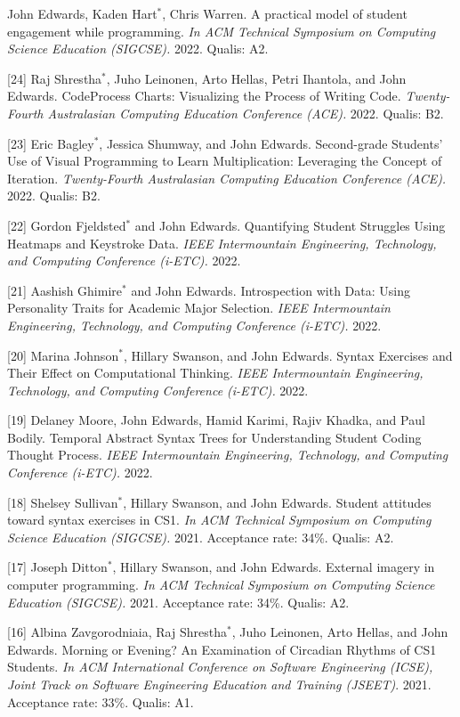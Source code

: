 \documentclass[margin,line]{res}
\newcommand{\cnum}[1]{[#1]}
\begin{document}
\begin{resume}
\cnum{25} John Edwards, Kaden Hart$^*$, Chris Warren. A practical model of student engagement while programming. \textit{In ACM Technical Symposium on Computing Science Education (SIGCSE).} 2022. Qualis: A2.

\cnum{24} Raj Shrestha$^*$, Juho Leinonen, Arto Hellas, Petri Ihantola, and John Edwards. CodeProcess Charts: Visualizing the Process of Writing Code. \textit{Twenty-Fourth Australasian Computing Education Conference (ACE).} 2022. Qualis: B2.

\cnum{23} Eric Bagley$^*$, Jessica Shumway, and John Edwards. Second-grade Students' Use of Visual Programming to Learn Multiplication: Leveraging the Concept of Iteration. \textit{Twenty-Fourth Australasian Computing Education Conference (ACE).} 2022. Qualis: B2.

\cnum{22} Gordon Fjeldsted$^*$ and John Edwards. Quantifying Student Struggles Using Heatmaps and Keystroke Data. \textit{IEEE Intermountain Engineering, Technology, and Computing Conference (i-ETC).} 2022.

\cnum{21} Aashish Ghimire$^*$ and John Edwards. Introspection with Data: Using Personality Traits for Academic Major Selection. \textit{IEEE Intermountain Engineering, Technology, and Computing Conference (i-ETC).} 2022.

\cnum{20} Marina Johnson$^*$, Hillary Swanson, and John Edwards. Syntax Exercises and Their Effect on Computational Thinking. \textit{IEEE Intermountain Engineering, Technology, and Computing Conference (i-ETC).} 2022.

\cnum{19} Delaney Moore, John Edwards, Hamid Karimi, Rajiv Khadka, and Paul Bodily. Temporal Abstract Syntax Trees for Understanding Student Coding Thought Process. \textit{IEEE Intermountain Engineering, Technology, and Computing Conference (i-ETC).} 2022.

\cnum{18} Shelsey Sullivan$^*$, Hillary Swanson, and John Edwards. Student attitudes toward syntax exercises in CS1. \textit{In ACM Technical Symposium on Computing Science Education (SIGCSE).} 2021. Acceptance rate: 34\%. Qualis: A2.

\cnum{17} Joseph Ditton$^*$, Hillary Swanson, and John Edwards. External imagery in computer programming. \textit{In ACM Technical Symposium on Computing Science Education (SIGCSE).} 2021. Acceptance rate: 34\%. Qualis: A2.

\cnum{16} Albina Zavgorodniaia, Raj Shrestha$^*$, Juho Leinonen, Arto Hellas, and John Edwards. Morning or Evening? An Examination of Circadian Rhythms of CS1 Students. \textit{In ACM International Conference on Software Engineering (ICSE), Joint Track on Software Engineering Education and Training (JSEET)}. 2021. Acceptance rate: 33\%. Qualis: A1.


\end{resume}
\end{document}
